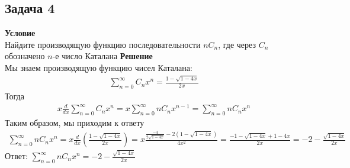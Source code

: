 	
	
	\subsection*{Задача 4}
	\noindent
	\textbf{Условие}\\
	Найдите производящую функцию последовательности $nC_n$, где через $C_n$ обозначено $n$-е число Каталана
	\vskip 0.1in
	\noindent
	\textbf{Решение}\\
	Мы знаем производящую функцию чисел Каталана:	
	\begin{gather*}
	\sum_{n=0}^{\infty} C_n x^n = \frac{1 - \sqrt{1-4x}}{2x} 
	\end{gather*}
	Тогда 
	\begin{gather*}
	x\frac{d}{d x}\sum_{n=0}^{\infty} C_n x^n = x \sum_{n=0}^{\infty} nC_n x^{n-1} =  
	\sum_{n=0}^{\infty}nC_n x^n
	\end{gather*}
	Таким образом, мы приходим к ответу
	\begin{gather*}
		\sum\limits_{n=0}^{\infty}nC_n x^n = x\frac{d}{d x}\left(\frac{1 - \sqrt{1-4x}}{2x}\right) = x \frac{\frac{-4}{2\sqrt{1-4x}}-2(1-\sqrt{1-4x})}
		{4x^2}=\frac{-1-\sqrt{1-4x}+1-4x}{2x} =
		-2-\frac{\sqrt{1-4x}}{2x}
	\end{gather*}
	\vskip 0.1in
	\noindent
	Ответ: $\sum\limits_{n=0}^{\infty}nC_n x^n = -2-\frac{\sqrt{1-4x}}{2x}$
	
	
